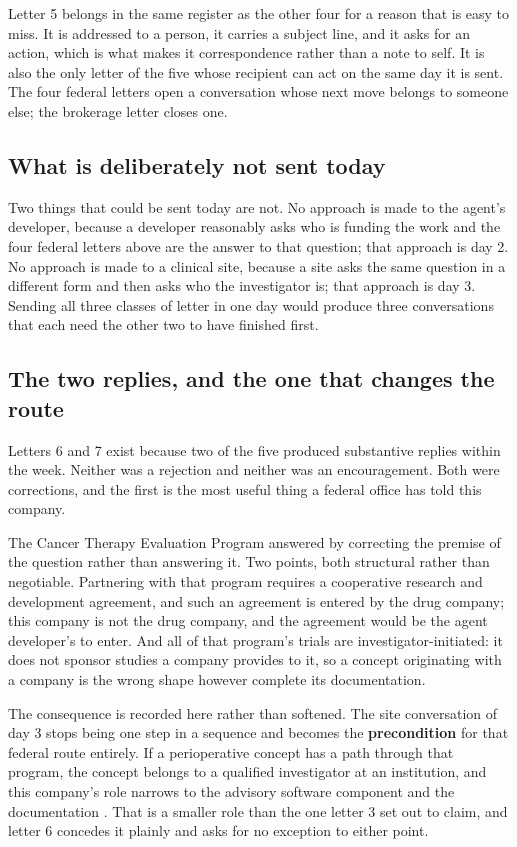 Letter 5 belongs in the same register as the other four for a reason that is
easy to miss. It is addressed to a person, it carries a subject line, and it
asks for an action, which is what makes it correspondence rather than a note to
self. It is also the only letter of the five whose recipient can act on the same
day it is sent. The four federal letters open a conversation whose next move
belongs to someone else; the brokerage letter closes one.

\subsection{What is deliberately not sent today}

Two things that could be sent today are not. No approach is made to the agent's
developer, because a developer reasonably asks who is funding the work and the
four federal letters above are the answer to that question; that approach is day
2. No approach is made to a clinical site, because a site asks the same question
in a different form and then asks who the investigator is; that approach is day
3. Sending all three classes of letter in one day would produce three
conversations that each need the other two to have finished first.

\subsection{The two replies, and the one that changes the route}

Letters 6 and 7 exist because two of the five produced substantive replies within
the week. Neither was a rejection and neither was an encouragement. Both were
corrections, and the first is the most useful thing a federal office has told
this company.

The Cancer Therapy Evaluation Program answered by correcting the premise of the
question rather than answering it. Two points, both structural rather than
negotiable. Partnering with that program requires a cooperative research and
development agreement, and such an agreement is entered by the drug company; this
company is not the drug company, and the agreement would be the agent developer's
to enter. And all of that program's trials are investigator-initiated: it does
not sponsor studies a company provides to it, so a concept originating with a
company is the wrong shape however complete its documentation.

The consequence is recorded here rather than softened. The site conversation of
day 3 stops being one step in a sequence and becomes the \textbf{precondition}
for that federal route entirely. If a perioperative concept has a path through
that program, the concept belongs to a qualified investigator at an institution,
and this company's role narrows to the advisory software component and the
documentation \cite{onpremwhippl}. That is a smaller role than the one letter 3
set out to claim, and letter 6 concedes it plainly and asks for no exception to
either point.


